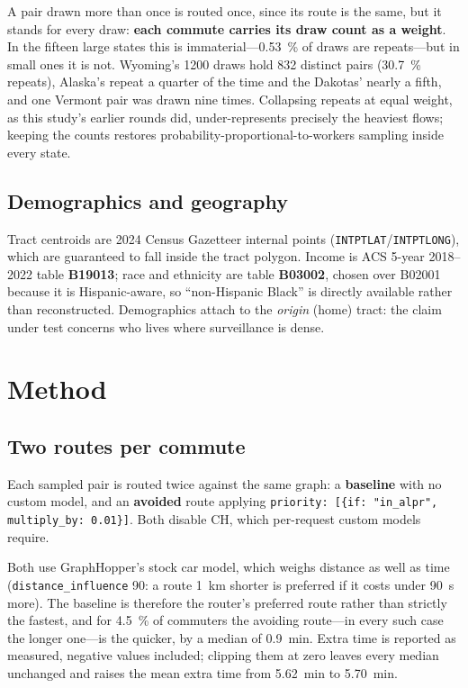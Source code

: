 \documentclass[11pt,twoside]{article}
\begin{document}
A pair drawn more than once is routed once, since its route is the same, but it stands for
every draw: \textbf{each commute carries its draw count as a weight}. In the fifteen large
states this is immaterial---\SI{0.53}{\percent} of draws are repeats---but in small ones it
is not. Wyoming's \num{1200} draws hold 832 distinct pairs (\SI{30.7}{\percent} repeats),
Alaska's repeat a quarter of the time and the Dakotas' nearly a fifth, and one Vermont pair was
drawn nine times. Collapsing repeats at equal weight, as this study's earlier rounds did,
under-represents precisely the heaviest flows; keeping the counts restores
probability-proportional-to-workers sampling inside every state.

\subsection{Demographics and geography}

Tract centroids are 2024 Census Gazetteer internal points \citep{gazetteer2024}
(\texttt{INTPTLAT}/\texttt{INTPTLONG}), which are guaranteed to fall inside the tract
polygon. Income is ACS 5-year 2018--2022 \citep{acs2022} table \textbf{B19013}; race and ethnicity are table
\textbf{B03002}, chosen over B02001 because it is Hispanic-aware, so ``non-Hispanic
Black'' is directly available rather than reconstructed. Demographics attach to the
\emph{origin} (home) tract: the claim under test concerns who lives where surveillance is
dense.

\section{Method}
\label{sec:method}

\subsection{Two routes per commute}

Each sampled pair is routed twice against the same graph: a \textbf{baseline} with no
custom model, and an \textbf{avoided} route applying
\texttt{priority: [\{if: "in\_alpr", multiply\_by: 0.01\}]}. Both disable CH, which
per-request custom models require.

Both use GraphHopper's stock car model, which weighs distance as well as time
(\texttt{distance\_\allowbreak influence} 90: a route \SI{1}{\kilo\metre} shorter is preferred if it
costs under \SI{90}{\second} more). The baseline is therefore the router's preferred route
rather than strictly the fastest, and for \SI{4.5}{\percent} of commuters the avoiding
route---in every such case the longer one---is the quicker, by a median of
\SI{0.9}{\minute}. Extra time is reported as measured, negative values included; clipping
them at zero leaves every median unchanged and raises the mean extra time from
\SI{5.62}{\minute} to \SI{5.70}{\minute}.
\end{document}
